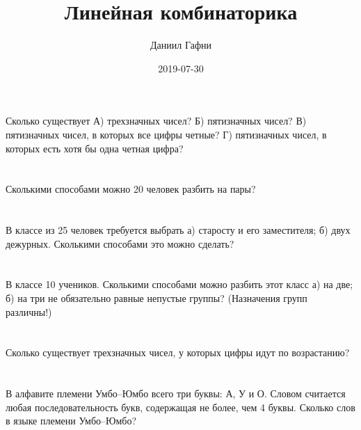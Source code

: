 \documentclass{article}%
\title{Линейная комбинаторика}%
\author{Даниил Гафни}%
\date{2019{-}07{-}30}%
\begin{document}
%
\normalsize%
\maketitle%
\section{}%
\label{sec:}%
Сколько существует
А) трехзначных чисел?
Б) пятизначных чисел?
В) пятизначных чисел, в которых все цифры четные?
Г) пятизначных чисел, в которых есть хотя бы одна четная цифра?%
%
\iffalse%
Автор: Ираклий Гагуа%
Дата: 07{-}01{-}2011%
Название: None%
Подсказка: \textbackslash{}\textbackslash{}%
nan%
\fi

%
\section{}%
\label{sec:}%
Сколькими способами можно 20 человек разбить на пары?%
%
\iffalse%
Автор: 25 школа%
Дата: 01{-}07{-}2017%
Название: None%
Подсказка: \textbackslash{}\textbackslash{}%
nan%
\fi

%
\section{}%
\label{sec:}%
В классе из 25 человек требуется выбрать а) старосту и его заместителя; б)
двух дежурных. Сколькими способами это можно сделать?%
%
\iffalse%
Автор: 25 школа%
Дата: 01{-}11{-}2012%
Название: None%
Подсказка: \textbackslash{}\textbackslash{}%
nan%
\fi

%
\section{}%
\label{sec:}%
В классе 10 учеников. Сколькими способами можно разбить этот класс а)
на две; б) на три не обязательно равные непустые группы? (Назначения
групп различны!)%
%
\iffalse%
Автор: 25 школа%
Дата: 01{-}11{-}2012%
Название: None%
Подсказка: \textbackslash{}\textbackslash{}%
nan%
\fi

%
\section{}%
\label{sec:}%
Сколько существует трехзначных чисел, у которых цифры идут по возрастанию?%
%
\iffalse%
Автор: Ираклий Гагуа%
Дата: 07{-}01{-}2011%
Название: None%
Подсказка: \textbackslash{}\textbackslash{}%
nan%
\fi

%
\section{}%
\label{sec:}%
В алфавите племени Умбо–Юмбо всего три буквы: А, У и О. Словом
считается любая последовательность букв, содержащая не более, чем 4
буквы. Сколько слов в языке племени Умбо–Юмбо?%
%
\iffalse%
Автор: 25 школа%
Дата: 01{-}11{-}2012%
Название: None%
Подсказка: \textbackslash{}\textbackslash{}%
nan%
\fi
\end{document}
